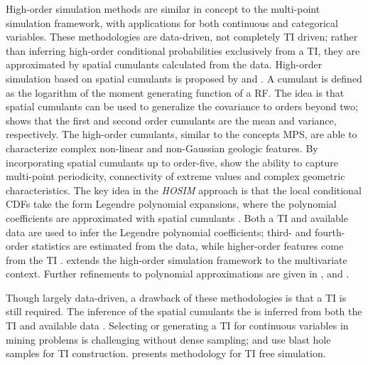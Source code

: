 High-order simulation methods are similar in concept to the multi-point simulation framework, with applications for both continuous and categorical variables. These methodologies are data-driven, not completely \gls{TI} driven; rather than inferring high-order conditional probabilities exclusively from a \gls{TI}, they are approximated by spatial cumulants calculated from the data. High-order simulation based on spatial cumulants is proposed by \cite{dimitrakopoulos2009highorder} and \cite{mustapha2010highorder,mustapha2011hosim}. A cumulant is defined as the logarithm of the moment generating function of a \gls{RF}. The idea is that spatial cumulants can be used to generalize the covariance to orders beyond two; \cite{dimitrakopoulos2009highorder} shows that the first and second order cumulants are the mean and variance, respectively. The high-order cumulants, similar to the concepts \gls{MPS}, are able to characterize complex non-linear and non-Gaussian geologic features. By incorporating spatial cumulants up to order-five, \cite{mustapha2010highorder} show the ability to capture multi-point periodicity, connectivity of extreme values and complex geometric characteristics. The key idea in the \textit{HOSIM} approach \citep{mustapha2011hosim} is that the local conditional \glspl{CDF} take the form Legendre polynomial expansions, where the polynomial coefficients are approximated with spatial cumulants \citep{mustapha2010highorder}. Both a \gls{TI} and available data are used to infer the Legendre polynomial coefficients; third- and fourth-order statistics are estimated from the data, while higher-order features come from the \gls{TI} \citep{minniakhmetov2022highorder}. \cite{minniakhmetov2017joint} extends the high-order simulation framework to the multivariate context. Further refinements to polynomial approximations are given in \cite{minniakhmetov2018highorder}, \cite{yao2020highorder} and \cite{yao2021learning}.

Though largely data-driven, a drawback of these methodologies is that a \gls{TI} is still required. The inference of the spatial cumulants the is inferred from both the \gls{TI} and available data \citep{mustapha2010highorder}. Selecting or generating a \gls{TI} for continuous variables in mining problems is challenging without dense sampling; \cite{minniakhmetov2018highorder} and \cite{decarvalho2019highorder} use blast hole samples for \gls{TI} construction. \cite{yao2021training} presents methodology for \gls{TI} free simulation.





